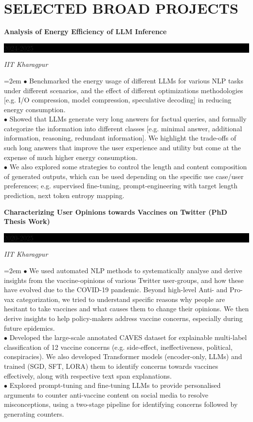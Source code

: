 \documentclass[paper=a4,fontsize=10pt]{scrartcl} %
\newcommand{\sepspace}{\vspace*{0.6em}}		%
\newcommand{\NewPart}[1]{\section*{\uppercase{#1}}}
\newcommand{\EducationEntry}[4]{
		\noindent \textbf{#1} \hfill      %
		\colorbox{Black}{%
			\parbox{6em}{%
			\hfill\color{White}#2}} \par  %
		\noindent \textit{#3} \par        %
		\noindent\hangindent=2em\hangafter=0 \small #4 %
		\normalsize \par}
\begin{document}
\NewPart{Selected Broad Projects}
\vspace*{-1mm}
{ \small

\EducationEntry{Analysis of Energy Efficiency of LLM Inference}{2024-2025}{IIT Kharagpur}{\noindent $\bullet$ Benchmarked the energy usage of different LLMs for various NLP tasks under different scenarios, and the effect of different optimizations methodologies [e.g. I/O compression, model compression, speculative decoding] in reducing energy consumption. \\
\noindent $\bullet$ Showed that LLMs generate very long answers for factual queries, and formally categorize the information into different classes [e.g. minimal answer, additional information, reasoning, redundant information].
We highlight the trade-offs of such long answers that improve the user experience and utility but come at the expense of much higher energy consumption. \\
\noindent $\bullet$ 
We also explored some strategies to control the length and content composition of generated outputs, which can be used depending on the specific use case/user preferences; e.g. supervised fine-tuning, prompt-engineering with target length prediction, next token entropy mapping.
}
\sepspace

\EducationEntry{Characterizing User Opinions towards Vaccines on Twitter (PhD Thesis Work)}{2020-2025}{IIT Kharagpur}{\noindent $\bullet$ We used automated NLP methods to systematically analyse and derive insights from the vaccine-opinions of various Twitter user-groups, and how these have evolved due to the COVID-19 pandemic. 
Beyond high-level Anti- and Pro-vax categorization, we tried to understand specific reasons why people are hesitant to take vaccines and what causes them to change their opinions.
We then derive insights to help policy-makers address vaccine concerns, especially during future epidemics.\\
\noindent $\bullet$ Developed the large-scale annotated CAVES dataset for explainable multi-label classification of 12 vaccine concerns (e.g. side-effect, ineffectiveness, political, conspiracies). 
We also developed Transformer models (encoder-only, LLMs) and trained (SGD, SFT, LORA) them to identify concerns towards vaccines effectively, along with respective text span explanations. \\
\noindent $\bullet$ Explored prompt-tuning and fine-tuning LLMs to provide personalised arguments to counter anti-vaccine content on social media to resolve misconceptions, using a two-stage pipeline for identifying concerns followed by generating counters.}
\sepspace


}
\end{document}
